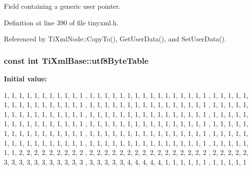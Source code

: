 Field containing a generic user pointer. 

Definition at line 390 of file tinyxml.h.

Referenced by TiXmlNode::CopyTo(), GetUserData(), and SetUserData().\hypertarget{class_ti_xml_base_ac8c86058137bdb4b413c3eca58f2d467}{
\subsubsection[{utf8ByteTable}]{\setlength{\rightskip}{0pt plus 5cm}const int {\bf TiXmlBase::utf8ByteTable}}}
\label{class_ti_xml_base_ac8c86058137bdb4b413c3eca58f2d467}
{\bfseries Initial value:}
\begin{DoxyCode}

  {
    
    1,  1,      1,      1,      1,      1,      1,      1,      1,      1,      1
      ,      1,      1,      1,      1,      1,      
    1,  1,      1,      1,      1,      1,      1,      1,      1,      1,      1
      ,      1,      1,      1,      1,      1,      
    1,  1,      1,      1,      1,      1,      1,      1,      1,      1,      1
      ,      1,      1,      1,      1,      1,      
    1,  1,      1,      1,      1,      1,      1,      1,      1,      1,      1
      ,      1,      1,      1,      1,      1,      
    1,  1,      1,      1,      1,      1,      1,      1,      1,      1,      1
      ,      1,      1,      1,      1,      1,      
    1,  1,      1,      1,      1,      1,      1,      1,      1,      1,      1
      ,      1,      1,      1,      1,      1,      
    1,  1,      1,      1,      1,      1,      1,      1,      1,      1,      1
      ,      1,      1,      1,      1,      1,      
    1,  1,      1,      1,      1,      1,      1,      1,      1,      1,      1
      ,      1,      1,      1,      1,      1,      
    1,  1,      1,      1,      1,      1,      1,      1,      1,      1,      1
      ,      1,      1,      1,      1,      1,      
    1,  1,      1,      1,      1,      1,      1,      1,      1,      1,      1
      ,      1,      1,      1,      1,      1,      
    1,  1,      1,      1,      1,      1,      1,      1,      1,      1,      1
      ,      1,      1,      1,      1,      1,      
    1,  1,      1,      1,      1,      1,      1,      1,      1,      1,      1
      ,      1,      1,      1,      1,      1,      
    1,  1,      2,      2,      2,      2,      2,      2,      2,      2,      2
      ,      2,      2,      2,      2,      2,      
    2,  2,      2,      2,      2,      2,      2,      2,      2,      2,      2
      ,      2,      2,      2,      2,      2,      
    3,  3,      3,      3,      3,      3,      3,      3,      3,      3,      3
      ,      3,      3,      3,      3,      3,      
    4,  4,      4,      4,      4,      1,      1,      1,      1,      1,      1
      ,      1,      1,      1,      1,      1       
  }
\end{DoxyCode}



